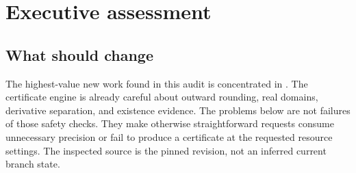 \documentclass[11pt,letterpaper]{article}
\newcommand{\src}[1]{\texttt{\small\detokenize{#1}}}
\theoremstyle{remark}\newtheorem{remark}[proposition]{Remark}
\begin{document}
\begin{abstract}
This review investigates the current AsymptoticAnalysis implementation against
its Wolfram and Mathics compatibility objective while screening out obligations
already recorded in the repository's external reviews. Two new shortcomings
remain after that screening. First, a positive rational just below one is
reduced to a logarithm near two minus a separately enclosed logarithm of two;
the resulting interval has an absolute uncertainty essentially unrelated to
the tiny logarithm being computed. Second, an exactly computed rational affine
argument of a logarithm is rounded near one before the logarithm is evaluated,
losing the small displacement that determines the answer. These mechanisms
are distinct: a four-variant, three-witness native experiment separates them.

The proposed repairs use reciprocal reduction below one and preserve exact
affine endpoints until after taking the logarithm. Their containment arguments
are proved, their selected public consequences are reproduced on Wolfram
15.0.0, and independent rational models pass 24 test methods. The article also
develops a narrowly scoped, positivity-guarded logarithmic-ratio residual
prototype. Mathics execution, canonical-source integration, a complete MUnit
run, and performance benchmarking remain outside the executed evidence.
\end{abstract}
\tableofcontents
\clearpage

\section{Executive assessment}

\subsection{What should change}
The highest-value new work found in this audit is concentrated in
\src{src/Kernel/InverseCertificates.wl}. The certificate engine is already
careful about outward rounding, real domains, derivative separation, and
existence evidence. The problems below are not failures of those safety
checks. They make otherwise straightforward requests consume unnecessary
precision or fail to produce a certificate at the requested resource
settings. The inspected source is the pinned revision, not an inferred
current branch state.\cite{source,certsource}
\end{document}
